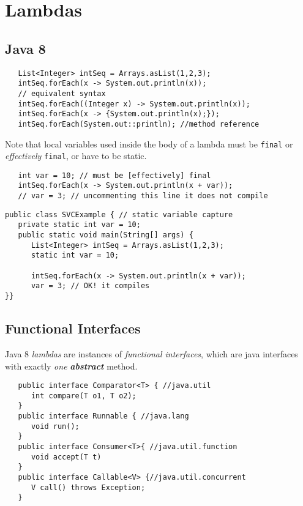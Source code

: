 \chapter{Lambdas}
\section{Java 8}
\lstset{style=javaBlock}
\begin{lstlisting}
   List<Integer> intSeq = Arrays.asList(1,2,3);
   intSeq.forEach(x -> System.out.println(x));
   // equivalent syntax
   intSeq.forEach((Integer x) -> System.out.println(x));
   intSeq.forEach(x -> {System.out.println(x);});
   intSeq.forEach(System.out::println); //method reference
\end{lstlisting}

Note that local variables used inside the body of a lambda must be \lstinline|final| or \textit{effectively} \lstinline|final|, or have to be static.
\begin{lstlisting}
   int var = 10; // must be [effectively] final
   intSeq.forEach(x -> System.out.println(x + var));
   // var = 3; // uncommenting this line it does not compile
\end{lstlisting}
\begin{lstlisting}
public class SVCExample { // static variable capture
   private static int var = 10;
   public static void main(String[] args) {
      List<Integer> intSeq = Arrays.asList(1,2,3);
      static int var = 10;
   
      intSeq.forEach(x -> System.out.println(x + var));
      var = 3; // OK! it compiles
}}
   \end{lstlisting}

\section{Functional Interfaces}
Java 8 \textit{lambdas} are instances of \textit{functional
interfaces},
which are java interfaces with exactly \textit{one} \textit{\textbf{abstract}} method.

\begin{lstlisting}
   public interface Comparator<T> { //java.util
      int compare(T o1, T o2);
   }
   public interface Runnable { //java.lang
      void run();
   }
   public interface Consumer<T>{ //java.util.function
      void accept(T t)
   }
   public interface Callable<V> {//java.util.concurrent
      V call() throws Exception;
   }
\end{lstlisting}

